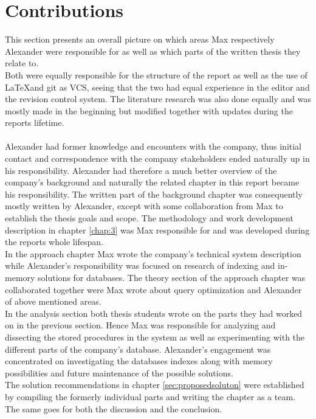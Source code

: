 \documentclass{cslthse-msc}
\begin{document}
\section{Contributions}
This section presents an overall picture on which areas Max respectively Alexander were responsible for as well as which parts of the written thesis they relate to.\\
Both were equally responsible for the structure of the report as well as the use of \LaTeX and git as VCS, seeing that the two had equal experience in the editor and the revision control system. The literature research was also done equally and was mostly made in the beginning but modified together with updates during the reports lifetime.\\\\
Alexander had former knowledge and encounters with the company, thus initial contact and correspondence with the company stakeholders ended naturally up in his responsibility. Alexander had therefore a much better overview of the company's background and naturally the related chapter in this report became his responsibility. The written part of the background chapter was consequently mostly written by Alexander, except with some collaboration from Max to establish the thesis goals and scope. The methodology and work development description in chapter \ref{chap:3} was Max responsible for and was developed during the reports whole lifespan.\\
In the approach chapter Max wrote the company's technical system description while Alexander's responsibility was focused on research of indexing and in-memory solutions for databases. The theory section of the approach chapter was collaborated together were Max wrote about query optimization and Alexander of above mentioned areas.\\
In the analysis section both thesis students wrote on the parts they had worked on in the previous section. Hence Max was responsible for analyzing and dissecting the stored procedures in the system as well as experimenting with the different parts of the company's database. Alexander's engagement was concentrated on investigating the databases indexes along with memory possibilities and future maintenance of the possible solutions.\\           
The solution recommendations in chapter \ref{sec:proposedsoluton} were established by compiling the formerly individual parts and writing the chapter as a team. The same goes for both the discussion and the conclusion. 
      
\end{document}
